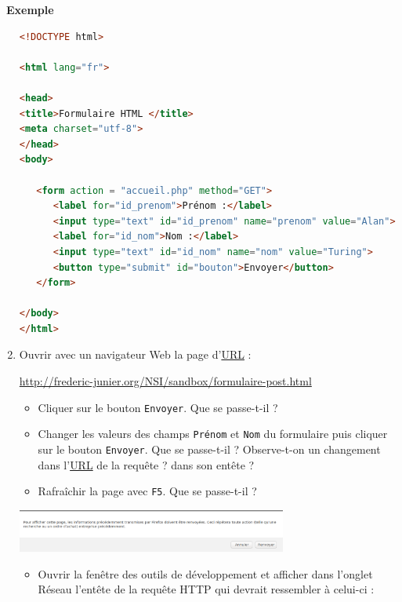 \documentclass[
  11pt,
]{article}
\newcommand{\passthrough}[1]{#1}
\providecommand{\tightlist}{%
  \setlength{\itemsep}{0pt}\setlength{\parskip}{0pt}}
\newcounter{exple}
\newenvironment{exemple}[1]
{\par \medskip   \addtocounter{exple}{1} \noindent  
\begin{bclogo}[arrondi =0.1,   noborder = true, logo=\bclampe, marge=4]{~\textbf{Exemple} \textbf{\theexple} {\itshape #1} }  \par}
{
\end{bclogo}
 \par \bigskip }
\begin{document}
\begin{exemple}{}
\begin{enumerate}
\begin{lstlisting}[language=HTML]
<!DOCTYPE html>

<html lang="fr">

<head>
<title>Formulaire HTML </title>
<meta charset="utf-8">    
</head> 
<body>

   <form action = "accueil.php" method="GET">        
      <label for="id_prenom">Prénom :</label>
      <input type="text" id="id_prenom" name="prenom" value="Alan">
      <label for="id_nom">Nom :</label>
      <input type="text" id="id_nom" name="nom" value="Turing">
      <button type="submit" id="bouton">Envoyer</button>
   </form>

</body>
</html> 
\end{lstlisting}
\item
  Ouvrir avec un navigateur Web la page
  d'\href{https://developer.mozilla.org/fr/docs/Glossaire/URL}{URL} :

  \url{http://frederic-junier.org/NSI/sandbox/formulaire-post.html}

  \begin{itemize}
  \tightlist
  \item
    Cliquer sur le bouton \passthrough{\lstinline!Envoyer!}. Que se
    passe-t-il ?
  \item
    Changer les valeurs des champs \passthrough{\lstinline!Prénom!} et
    \passthrough{\lstinline!Nom!} du formulaire puis cliquer sur le
    bouton \passthrough{\lstinline!Envoyer!}. Que se passe-t-il ?
    Observe-t-on un changement dans
    l'\href{https://developer.mozilla.org/fr/docs/Glossaire/URL}{URL} de
    la requête ? dans son entête ?
  \item
    Rafraîchir la page avec \passthrough{\lstinline!F5!}. Que se
    passe-t-il ?
  \end{itemize}

  \includegraphics[width=0.7\textwidth,height=\textheight]{images/avertissement-post.png}\\

  \begin{itemize}
  \tightlist
  \item
    Ouvrir la fenêtre des outils de développement et afficher dans
    l'onglet Réseau l'entête de la requête HTTP qui devrait ressembler à
    celui-ci :
  \end{itemize}


\end{enumerate}
\end{exemple}
\end{document}
